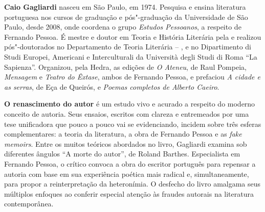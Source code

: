 
\textbf{Caio Gagliardi} nasceu em São Paulo, em 1974. Pesquisa e ensina literatura portuguesa nos cursos de graduação e pós"-graduação da Universidade de São Paulo, desde 2008, onde coordena o grupo \emph{Estudos Pessoanos}, a respeito de Fernando Pessoa. É mestre e doutor em Teoria e História Literária pela  e realizou pós"-doutorados no Departamento de Teoria Literária -- , e no Dipartimento di Studi Europei, Americani e Interculturali da Università degli Studi di Roma ``La Sapienza''. Organizou, pela Hedra, as edições de \emph{O Ateneu}, de Raul Pompeia, \emph{Mensagem} e \emph{Teatro do Êxtase}, ambos de Fernando Pessoa, e prefaciou \emph{A cidade e as serras}, de Eça de Queirós, e \emph{Poemas completos de Alberto Caeiro}.


\textbf{O renascimento do autor} é um estudo vivo e acurado a respeito do moderno conceito de autoria. Seus ensaios, escritos com clareza e entremeados por uma tese unificadora que pouco a pouco vai se evidenciando, incidem sobre três esferas complementares: a teoria da literatura, a obra de Fernando Pessoa e as \emph{fake memoirs}. Entre os muitos teóricos abordados no livro, Gagliardi examina sob diferentes ângulos ``A morte do autor'', de Roland Barthes. Especialista em Fernando Pessoa, o crítico convoca a obra do escritor português para repensar a autoria com base em sua experiência poética mais radical e, simultaneamente, para propor a reinterpretação da heteronímia. O desfecho do livro amalgama seus múltiplos enfoques ao conferir especial atenção às fraudes autorais na literatura contemporânea.

